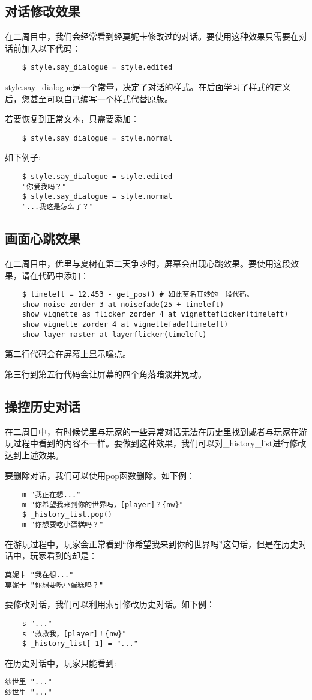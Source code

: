 \documentclass[../../Main.tex]{subfiles}
\begin{document}
\subsection{对话修改效果}
在二周目中，我们会经常看到经莫妮卡修改过的对话。要使用这种效果只需要在对话前加入以下代码：
\begin{lstlisting}
    $ style.say_dialogue = style.edited
\end{lstlisting}

\begin{ExtraKnowledge}
    style.say\_dialogue是一个常量，决定了对话的样式。在后面学习了样式的定义后，您甚至可以自己编写一个样式代替原版。
\end{ExtraKnowledge}

若要恢复到正常文本，只需要添加：
\begin{lstlisting}
    $ style.say_dialogue = style.normal
\end{lstlisting}

如下例子:
\begin{lstlisting}
    $ style.say_dialogue = style.edited
    "你爱我吗？"
    $ style.say_dialogue = style.normal
    "...我这是怎么了？"
\end{lstlisting}

\subsection{画面心跳效果}
在二周目中，优里与夏树在第二天争吵时，屏幕会出现心跳效果。要使用这段效果，请在代码中添加：
\begin{lstlisting}
    $ timeleft = 12.453 - get_pos() # 如此莫名其妙的一段代码。
    show noise zorder 3 at noisefade(25 + timeleft) 
    show vignette as flicker zorder 4 at vignetteflicker(timeleft)
    show vignette zorder 4 at vignettefade(timeleft)
    show layer master at layerflicker(timeleft)
\end{lstlisting}

第二行代码会在屏幕上显示噪点。

第三行到第五行代码会让屏幕的四个角落暗淡并晃动。

\subsection{操控历史对话}
在二周目中，有时候优里与玩家的一些异常对话无法在历史里找到或者与玩家在游玩过程中看到的内容不一样。要做到这种效果，我们可以对\_history\_list进行修改达到上述效果。

要删除对话，我们可以使用pop函数删除。如下例：
\begin{lstlisting}
    m "我正在想..."
    m "你希望我来到你的世界吗，[player]？{nw}"
    $ _history_list.pop()
    m "你想要吃小蛋糕吗？"
\end{lstlisting}
在游玩过程中，玩家会正常看到“你希望我来到你的世界吗”这句话，但是在历史对话中，玩家看到的却是：
\begin{lstlisting}
莫妮卡 "我在想..."
莫妮卡 "你想要吃小蛋糕吗？"
\end{lstlisting}

要修改对话，我们可以利用索引修改历史对话。如下例：
\begin{lstlisting}
    s "..."
    s "救救我，[player]！{nw}"
    $ _history_list[-1] = "..."
\end{lstlisting}

在历史对话中，玩家只能看到:
\begin{lstlisting}
纱世里 "..."
纱世里 "..."
\end{lstlisting}
\end{document}
